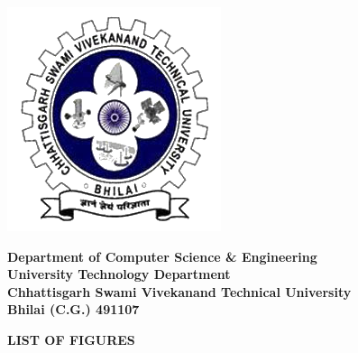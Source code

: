 \newpage
\begin{minipage}{0.17\textwidth}
  \centering
  \includegraphics[width=\textwidth]{images/logo.png}
\end{minipage}
\hfil
\large
\begin{minipage}{0.7\textwidth}
  \centering
  \textbf{Department of Computer Science \& Engineering}\\
  \textbf{University Technology Department}\\
  \textbf{Chhattisgarh Swami Vivekanand Technical University}\\
  \textbf{Bhilai (C.G.) 491107}
\end{minipage}

\noindent\makebox[\linewidth]{\rule{\textwidth}{0.4pt}}

\begin{center}
  \Large\textbf{LIST OF FIGURES}
\end{center}

\vspace{0.5cm}

